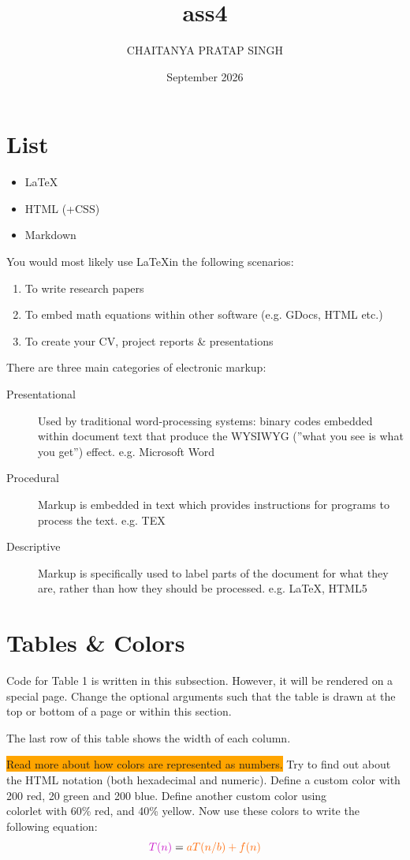 \documentclass{article}
\title{ass4}
\author{CHAITANYA PRATAP SINGH}
\date{September 2026}
\begin{document}
\section{List}

\begin{itemize}
    \item  \LaTeX
    \item HTML (+CSS)
    \item Markdown
\end{itemize}

You would most likely use \LaTeX in the following scenarios:
\begin{enumerate}
    \item To write research papers
    \item To embed math equations within other software (e.g. GDocs, HTML etc.)
    \item To create your CV, project reports \& presentations
\end{enumerate}

There are three main categories of electronic markup:
\begin{description}
    \item[Presentational] Used by traditional word-processing systems: binary codes embedded
within document text that produce the WYSIWYG (”what you see is what you
get”) effect. e.g. Microsoft Word
    \item[Procedural] Markup is embedded in text which provides instructions for programs to
process the text. e.g. TEX
    \item[Descriptive]  Markup is specifically used to label parts of the document for what they
are, rather than how they should be processed. e.g. \LaTeX, HTML5
\end{description}

\newpage

\section{Tables \& Colors}
Code for Table 1 is written in this subsection. However, it will be rendered on a special page. Change the optional arguments such that the table is drawn at the top or bottom of a page or within this section. 

The last row of this table shows the width of each column.

\colorbox{orange}{Read more about how colors are represented as numbers.} Try to find out about the HTML notation (both hexadecimal and numeric). Define a custom color with 200 red, 20 green and 200 blue. Define another custom color using \\colorlet with 60\% red, and 40\% yellow. Now use these colors to write the following equation:
\begin{equation}
    \textcolor{mycolor}{
    T(n) 
    }
    =
    \textcolor{mycolorTwo}{
    aT(n/b) + f(n)
    }
\end{equation}
\end{document}
